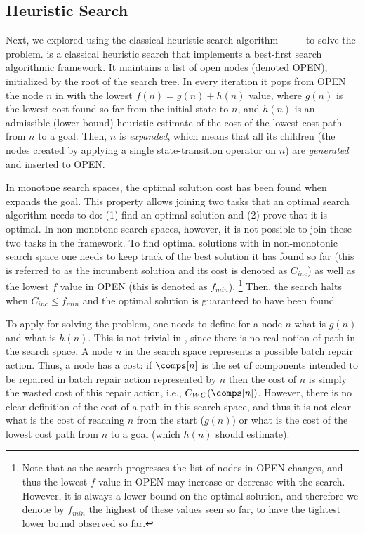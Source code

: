 \documentclass[review]{elsarticle}
\begin{document}
\subsection{Heuristic Search}
Next, we explored using the classical heuristic search algorithm --  \astar{}~\cite{hart1968formal} -- to solve the \brps{} problem. 
\astar{} is a classical heuristic search that implements a best-first search algorithmic framework. 
It maintains a list of open nodes (denoted OPEN), initialized by the root of the search tree. 
In every iteration it pops from OPEN the node $n$ in with the lowest $f(n)=g(n)+h(n)$ value, 
where $g(n)$ is the lowest cost found so far from the initial state to $n$, and $h(n)$ is an admissible (lower bound) heuristic estimate of the 
cost of the lowest cost path from $n$ to a goal. Then, $n$ is {\em expanded}, which means that all its children (the nodes created by applying a single state-transition operator on $n$) 
are {\em generated} and inserted to OPEN.


In monotone search spaces, the optimal solution cost has been found when \astar{} expands the goal. 
This property allows joining two tasks that an optimal search algorithm needs to do: (1) find an optimal solution and (2) prove that it is optimal. 
In non-monotone search spaces, however, it is not possible to join these two tasks in the \astar{} framework. 
To find optimal solutions with \astar{} in non-monotonic search space one needs to keep track of the best solution it has found so far
(this is referred to as the incumbent solution and its cost is denoted as $C_{inc}$) as well as the lowest $f$ value in OPEN (this is denoted as $f_{min}$).
\footnote{Note that as the search progresses the list of nodes in OPEN changes, and thus the lowest $f$ value in OPEN may increase or decrease with the search.
However, it is always a lower bound on the optimal solution, and therefore we denote by $f_{min}$ the highest of these values seen so far, to have the tightest lower bound observed so far.} 
Then, the search halts when $C_{inc}\leq f_{min}$ and the optimal solution is guaranteed to have been found. 


To apply \astar{} for solving the \brps{} problem, one needs to define for a node $n$ what is $g(n)$ and what is $h(n)$. 
This is not trivial in \brps{}, since there is no real notion of path in the \brps{} search space. 
A node $n$ in the \brps{} search space represents a possible batch repair action. 
Thus, a node has a cost: if $\comps[n]$ is the set of components intended to be repaired in batch repair action represented by $n$ 
then the cost of $n$ is simply the wasted cost of  this repair action, i.e., $C_{WC}(\comps[n])$. 
However, there is no clear definition of the cost of a path in this search space, and thus 
it is not clear what is the cost of reaching $n$ from the start ($g(n)$) or what is the cost of the lowest cost path from $n$ to a goal (which $h(n)$ should estimate). 
\end{document}
